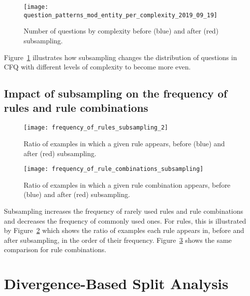\documentclass[letterpaper]{article}
\begin{document}
\begin{figure}[tb]
\centering
    \texttt{[image: question\_patterns\_mod\_entity\_per\_complexity\_2019\_09\_19]}\caption{Number of questions by complexity before (blue) and after (red) subsampling.}
    \label{fig:distribution-by-complexity}
\end{figure}

Figure~\ref{fig:distribution-by-complexity} illustrates how subsampling changes the distribution of questions in CFQ with different levels of complexity to become more even.

\subsection{Impact of subsampling on the frequency of rules and rule combinations}

\begin{figure}[tb]
\centering
    \texttt{[image: frequency\_of\_rules\_subsampling\_2]}\caption{Ratio of examples in which a given rule appears, before (blue) and after (red) subsampling.}
    \label{fig:frequency-of-rules-subsampling}
\end{figure}

\begin{figure}[tb]
\centering
    \texttt{[image: frequency\_of\_rule\_combinations\_subsampling]}\caption{Ratio of examples in which a given rule combination appears, before (blue) and after (red) subsampling.}
    \label{fig:frequency-of-rule-combinations-subsampling}
\end{figure}

Subsampling increases the frequency of rarely used rules and rule combinations and decreases the frequency of commonly used ones. For rules, this is illustrated by Figure~\ref{fig:frequency-of-rules-subsampling} which shows the ratio of examples each rule appears in, before and after subsampling, in the order of their frequency. Figure~\ref{fig:frequency-of-rule-combinations-subsampling} shows the same comparison for rule combinations. 

\section{Divergence-Based Split Analysis}
\label{suppl:split-analysis}
\end{document}
